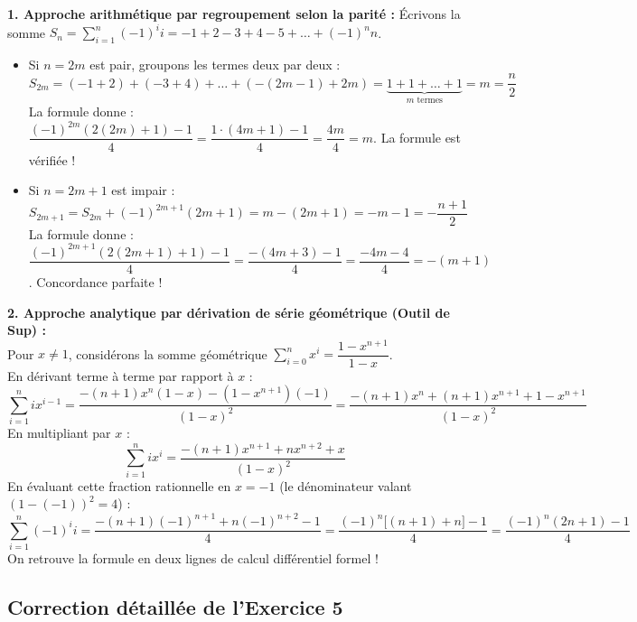 \documentclass[11pt,a4paper]{article}
\begin{document}
\begin{prolongementbox}
\textbf{1. Approche arithmétique par regroupement selon la parité :}
Écrivons la somme $S_n = \sum_{i=1}^n (-1)^i i = -1 + 2 - 3 + 4 - 5 + \dots + (-1)^n n$.
\begin{itemize}[leftmargin=*, label=$\bullet$]
    \item Si $n = 2m$ est pair, groupons les termes deux par deux :
    \[
    S_{2m} = (-1 + 2) + (-3 + 4) + \dots + (-(2m-1) + 2m) = \underbrace{1 + 1 + \dots + 1}_{m \text{ termes}} = m = \frac{n}{2}
    \]
    La formule donne : $\dfrac{(-1)^{2m}(2(2m)+1)-1}{4} = \dfrac{1 \cdot (4m+1)-1}{4} = \dfrac{4m}{4} = m$. La formule est vérifiée !
    \item Si $n = 2m+1$ est impair :
    \[
    S_{2m+1} = S_{2m} + (-1)^{2m+1}(2m+1) = m - (2m+1) = -m - 1 = -\frac{n+1}{2}
    \]
    La formule donne : $\dfrac{(-1)^{2m+1}(2(2m+1)+1)-1}{4} = \dfrac{-(4m+3)-1}{4} = \dfrac{-4m-4}{4} = -(m+1)$. Concordance parfaite !
\end{itemize}

\textbf{2. Approche analytique par dérivation de série géométrique (Outil de Sup) :}\\
Pour $x \neq 1$, considérons la somme géométrique $\sum_{i=0}^n x^i = \dfrac{1 - x^{n+1}}{1 - x}$.\\
En dérivant terme à terme par rapport à $x$ :
\[
\sum_{i=1}^n i x^{i-1} = \frac{-(n+1)x^n(1-x) - (1-x^{n+1})(-1)}{(1-x)^2} = \frac{-(n+1)x^n + (n+1)x^{n+1} + 1 - x^{n+1}}{(1-x)^2}
\]
En multipliant par $x$ :
\[
\sum_{i=1}^n i x^i = \frac{-(n+1)x^{n+1} + n x^{n+2} + x}{(1-x)^2}
\]
En évaluant cette fraction rationnelle en $x = -1$ (le dénominateur valant $(1 - (-1))^2 = 4$) :
\[
\sum_{i=1}^n (-1)^i i = \frac{-(n+1)(-1)^{n+1} + n(-1)^{n+2} - 1}{4} = \frac{(-1)^n \Big[ (n+1) + n \Big] - 1}{4} = \frac{(-1)^n (2n+1) - 1}{4}
\]
On retrouve la formule en deux lignes de calcul différentiel formel !
\end{prolongementbox}

\vspace{0.3cm}

\subsection*{Correction détaillée de l'Exercice 5}
\end{document}
